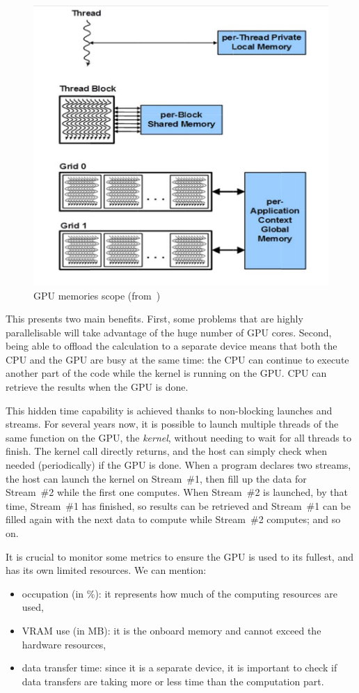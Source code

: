 \begin{figure}[h]
	\centering
	\includegraphics[width=0.6\linewidth]{gpu-memory-scope}
	\caption{GPU memories scope (from~\cite{nvidia:keplerarch})}
	\label{fig:gpu-memory-scope}
\end{figure}


This presents two main benefits. First, some problems that are highly parallelisable will take advantage of the huge number of GPU cores. Second, being able to offload the calculation to a separate device means that both the CPU and the GPU are busy at the same time: the CPU can continue to execute another part of the code while the kernel is running on the GPU. CPU can retrieve the results when the GPU is done.


This hidden time capability is achieved thanks to non-blocking launches and streams. For several years now, it is possible to launch multiple threads of the same function on the GPU, the \emph{kernel}, without needing to wait for all threads to finish. The kernel call directly returns, and the host can simply check when needed (periodically) if the GPU is done. When a program declares two streams, the host can launch the kernel on Stream~\#1, then fill up the data for Stream~\#2 while the first one computes. When Stream~\#2 is launched, by that time, Stream~\#1 has finished, so results can be retrieved and Stream~\#1 can be filled again with the next data to compute while Stream~\#2 computes; and so on.

It is crucial to monitor some metrics to ensure the GPU is used to its fullest, and has its own limited resources. We can mention:

\begin{itemize}
	\item occupation (in \%): it represents how much of the computing resources are used,
	\item VRAM use (in MB): it is the onboard memory and cannot exceed the hardware resources,
	\item data transfer time: since it is a separate device, it is important to check if data transfers are taking more or less time than the computation part.
\end{itemize}
